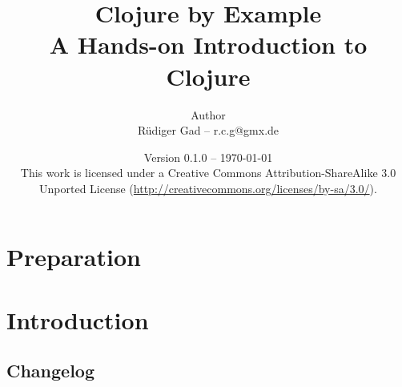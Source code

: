 


\title{
  \Huge Clojure by Example\\
  \vspace{1cm}
  \Large A Hands-on Introduction to Clojure
  \vspace{3cm}
}
\author{
  Author\\
  Rüdiger Gad -- r.c.g@gmx.de\\
  \vspace{3cm}
}
\date{Version 0.1.0 -- \today{}\\
\vspace{3cm}
{\footnotesize This work is licensed under a Creative Commons Attribution-ShareAlike 3.0 Unported License (\url{http://creativecommons.org/licenses/by-sa/3.0/}).}
}





\begin{titlepage}
  \maketitle
  \thispagestyle{empty}
\end{titlepage}



\tableofcontents  
\newpage


%


%




\newpage



\pagestyle{scrheadings}

\part{Preparation}



\part{Introduction}



\appendix

\chapter{Changelog}

